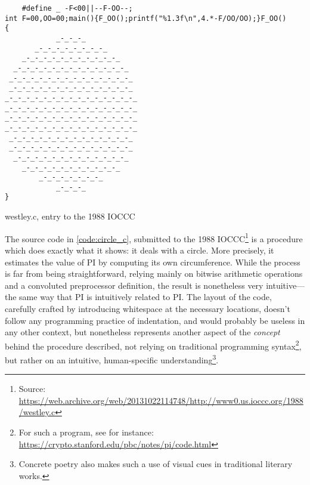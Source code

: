 \begin{listing}
  \begin{verbatim}
    #define _ -F<00||--F-OO--;
int F=00,OO=00;main(){F_OO();printf("%1.3f\n",4.*-F/OO/OO);}F_OO()
{
            _-_-_-_
       _-_-_-_-_-_-_-_-_
    _-_-_-_-_-_-_-_-_-_-_-_
  _-_-_-_-_-_-_-_-_-_-_-_-_-_
 _-_-_-_-_-_-_-_-_-_-_-_-_-_-_
 _-_-_-_-_-_-_-_-_-_-_-_-_-_-_
_-_-_-_-_-_-_-_-_-_-_-_-_-_-_-_
_-_-_-_-_-_-_-_-_-_-_-_-_-_-_-_
_-_-_-_-_-_-_-_-_-_-_-_-_-_-_-_
_-_-_-_-_-_-_-_-_-_-_-_-_-_-_-_
 _-_-_-_-_-_-_-_-_-_-_-_-_-_-_
 _-_-_-_-_-_-_-_-_-_-_-_-_-_-_
  _-_-_-_-_-_-_-_-_-_-_-_-_-_
    _-_-_-_-_-_-_-_-_-_-_-_
        _-_-_-_-_-_-_-_
            _-_-_-_
}
  \end{verbatim}
  \caption{westley.c, entry to the 1988 IOCCC}
  \label{code:circle_c}
\end{listing}

The source code in \ref{code:circle_c}, submitted to the 1988 IOCCC\footnote{Source: \url{https://web.archive.org/web/20131022114748/http://www0.us.ioccc.org/1988/westley.c}} is a procedure which does exactly what it shows: it deals with a circle. More precisely, it estimates the value of PI by computing its own circumference. While the process is far from being straightforward, relying mainly on bitwise arithmetic operations and a convoluted preprocessor definition, the result is nonetheless very intuitive—the same way that PI is intuitively related to PI. The layout of the code, carefully crafted by introducing whitespace at the necessary locations, doesn't follow any programming practice of indentation, and would probably be useless in any other context, but nonetheless represents another aspect of the \emph{concept} behind the procedure described, not relying on traditional programming syntax\footnote{For such a program, see for instance: \url{https://crypto.stanford.edu/pbc/notes/pi/code.html}}, but rather on an intuitive, human-specific understanding\footnote{Concrete poetry also makes such a use of visual cues in traditional literary works.}.

